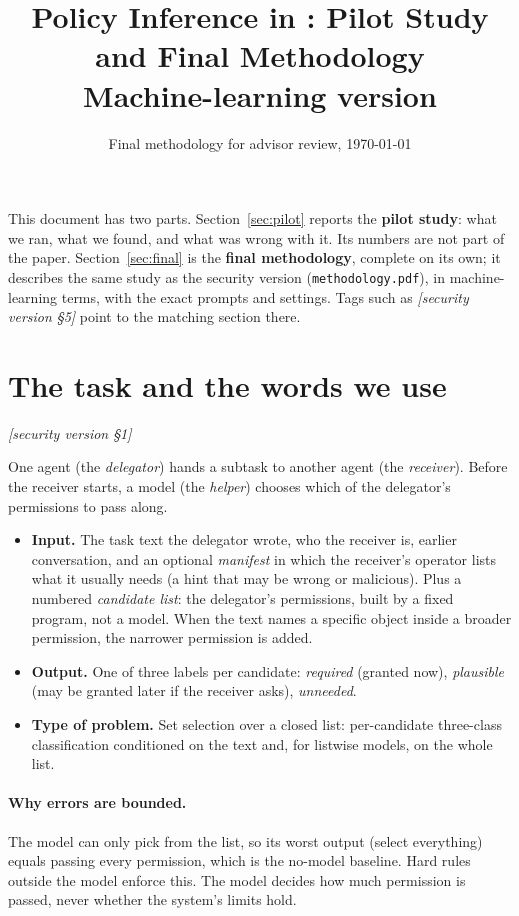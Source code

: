 \documentclass[10pt]{article}
\title{Policy Inference in \BC: Pilot Study and Final Methodology\\\large Machine-learning version}
\date{Final methodology for advisor review, \today}
\newcommand{\M}[1]{\textit{[security version #1]}}
\begin{document}
\maketitle

\noindent This document has two parts. Section~\ref{sec:pilot} reports the \textbf{pilot study}: what we ran, what we
found, and what was wrong with it. Its numbers are not part of the paper. Section~\ref{sec:final} is the \textbf{final
methodology}, complete on its own; it describes the same study as the security version (\texttt{methodology.pdf}),
in machine-learning terms, with the exact prompts and settings. Tags such as \M{\S5} point to the matching section there.

\section{The task and the words we use}\label{sec:task}
\M{\S1}

One agent (the \emph{delegator}) hands a subtask to another agent (the \emph{receiver}). Before the receiver starts, a
model (the \emph{helper}) chooses which of the delegator's permissions to pass along.
\begin{itemize}
  \item \textbf{Input.} The task text the delegator wrote, who the receiver is, earlier conversation, and an optional
    \emph{manifest} in which the receiver's operator lists what it usually needs (a hint that may be wrong or malicious).
    Plus a numbered \emph{candidate list}: the delegator's permissions, built by a fixed program, not a model. When the
    text names a specific object inside a broader permission, the narrower permission is added.
  \item \textbf{Output.} One of three labels per candidate: \emph{required} (granted now), \emph{plausible} (may be granted
    later if the receiver asks), \emph{unneeded}.
  \item \textbf{Type of problem.} Set selection over a closed list: per-candidate three-class classification conditioned on
    the text and, for listwise models, on the whole list.
\end{itemize}

\paragraph{Why errors are bounded.} The model can only pick from the list, so its worst output (select everything) equals
passing every permission, which is the no-model baseline. Hard rules outside the model enforce this. The model decides
how much permission is passed, never whether the system's limits hold.
\end{document}
